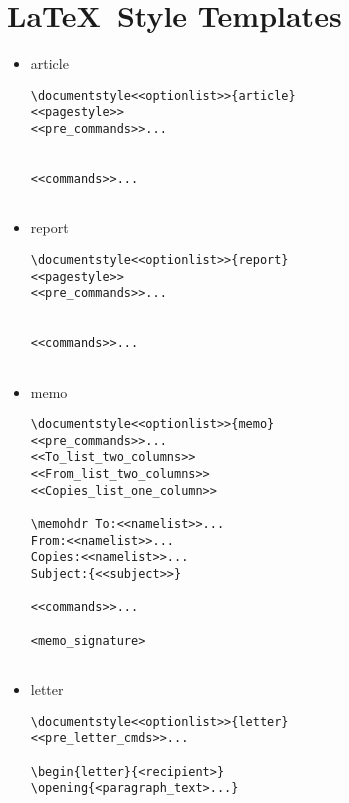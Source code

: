 \newpage
\section{\LaTeX\ Style Templates} 
\label{templates}

\begin{itemize}

\item article

\begin{small}
\begin{verbatim}
\documentstyle<<optionlist>>{article}
<<pagestyle>>
<<pre_commands>>...


<<commands>>...


\end{verbatim}
\end{small}

\item report

\begin{small}
\begin{verbatim}
\documentstyle<<optionlist>>{report}
<<pagestyle>>
<<pre_commands>>...


<<commands>>...


\end{verbatim}
\end{small}

\item memo

\begin{small}
\begin{verbatim}
\documentstyle<<optionlist>>{memo}
<<pre_commands>>...
<<To_list_two_columns>>
<<From_list_two_columns>>
<<Copies_list_one_column>>

\memohdr To:<<namelist>>...
From:<<namelist>>...
Copies:<<namelist>>...
Subject:{<<subject>>}

<<commands>>...

<memo_signature>


\end{verbatim}
\end{small}

\newpage

\item letter

\begin{small}
\begin{verbatim}
\documentstyle<<optionlist>>{letter}
<<pre_letter_cmds>>...

\begin{letter}{<recipient>}
\opening{<paragraph_text>...}


\end{verbatim}
\end{small}
\end{itemize}
